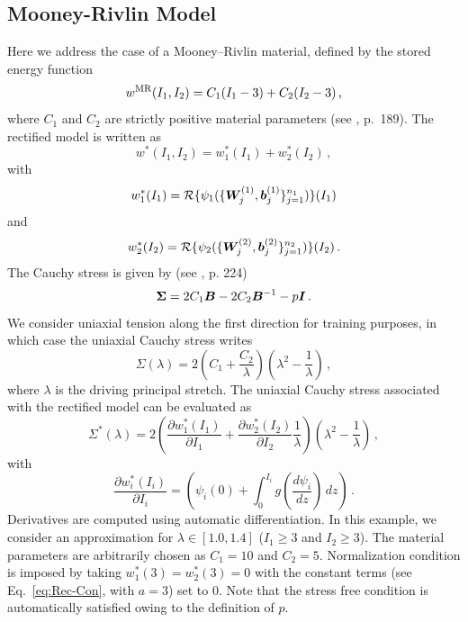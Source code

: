 \subsection{Mooney-Rivlin Model}\label{subsec:MR}
Here we address the case of a Mooney–Rivlin material, defined by the stored energy function
\begin{equation}
    w{^\textnormal{MR}}(I_1,I_2) = C_1(I_1 - 3) + C_2(I_2 - 3)\,, \label{eq:MR}
\end{equation}
where $C_1$ and $C_2$ are strictly positive material parameters (see \cite{ciarlet1988mathematical}, p.~189). The rectified model is written as
\begin{equation}
    w^*(I_1, I_2) = w_1^*(I_1) + w_2^*(I_2)\,,
\end{equation}
with 
\begin{align}
    w_1^*(I_1) = \mathcal{R}\{\psi_1(\{\boldsymbol{W}_j^{(1)}, \boldsymbol{b}_j^{(1)}\}_{j = 1}^{n_1})\}(I_1)
\end{align}
and
\begin{align}
w_2^*(I_2) = \mathcal{R}\{\psi_2(\{\boldsymbol{W}_j^{(2)}, \boldsymbol{b}_j^{(2)}\}_{j = 1}^{n_2})\}(I_2)\,.
\end{align}
The Cauchy stress is given by (see \cite{HolzapfelBook}, p. 224)
\begin{equation}
    \boldsymbol{\Sigma} = 2C_1\boldsymbol{B} - 2C_2\boldsymbol{B}^{-1} - p \boldsymbol{I}\,.
\end{equation}
We consider uniaxial tension along the first direction for training purposes, in which case the uniaxial Cauchy stress writes 
\begin{equation}
    \Sigma(\lambda) = 2\left(C_1 + \frac{ C_2}{\lambda}\right)\left(\lambda^2 - \frac{1}{\lambda}\right)\,, \label{eq:MR_Cauchy}
\end{equation}
where $\lambda$ is the driving principal stretch. The uniaxial Cauchy stress associated with the rectified model can be evaluated as
\begin{equation}
    \Sigma^*(\lambda) = 2 \left( \frac{\partial w_1^*(I_1)}{\partial I_1} + \frac{\partial w_2^*(I_2)}{\partial I_2} \frac{1}{\lambda} \right) \left( \lambda^2 - \frac{1}{\lambda} \right)\,, 
\end{equation}
with
\begin{equation}
    \frac{\partial w_i^*(I_i)}{\partial I_i} =  \left( \psi_i(0) + \int_0^{I_i} g\left(\frac{d\psi_i}{dz}\right)\, dz \right)\,.
\end{equation}
Derivatives are computed using automatic differentiation. In this example, we consider an approximation for $\lambda \in [1.0, 1.4]$ ($I_1 \geq 3$ and $I_2 \geq 3$). The material parameters are arbitrarily chosen as $C_1 = 10$ and $C_2 = 5$. Normalization condition is imposed by taking $w_1^*(3) = w_2^*(3) = 0$ with the constant terms (see Eq.~\eqref{eq:Rec-Con}, with $a = 3$) set to 0. Note that the stress free condition is automatically satisfied owing to the definition of $p$.

